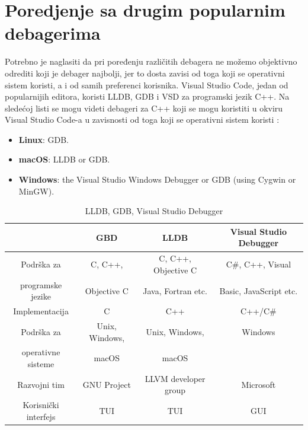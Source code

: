 \documentclass[a4paper]{article}
\begin{document}
\section{Poredjenje sa drugim popularnim debagerima}
\label{sec:naslovN}

Potrebno je naglasiti da pri poređenju različitih debagera ne možemo objektivno odrediti koji je debager najbolji, jer to dosta zavisi od toga koji se operativni sistem koristi, a i od samih preferenci korisnika. Visual Studio Code, jedan od popularnijih editora, koristi LLDB, GDB i VSD za programski jezik C++. Na sledećoj listi se mogu videti debageri za C++ koji se mogu koristiti u okviru Visual Studio Code-a u zavisnosti od toga koji se operativni sistem koristi \cite{vsc_support}:
\begin{itemize}
	\item \textbf{Linux}: GDB.
	\item \textbf{macOS}: LLDB or GDB.
	\item \textbf{Windows}: the Visual Studio Windows Debugger or GDB (using Cygwin or MinGW).
\end{itemize}

\begin{table}[ht!]
	\begin{center}
		\caption{LLDB, GDB, Visual Studio Debugger \cite{gdb}\cite{lldb}\cite{vsd}}
		\label{table:tabela_poredjenje}
		\begin{footnotesize}
			\begin{tabular}{| c | c | c | c |}
				\hline
				& \cellcolor{red!60}GBD & \cellcolor{red!60}LLDB & \cellcolor{red!60}Visual Studio Debugger \\ 
				\hline
				\cellcolor{orange!60}Podrška za& \cellcolor{yellow!60}C, C++, & \cellcolor{yellow!60}C, C++, Objective C & \cellcolor{yellow!60}C\#, C++, Visual \\ 
				\cellcolor{orange!60}programske jezike & \cellcolor{yellow!60}Objective C & \cellcolor{yellow!60}Java, Fortran etc. & \cellcolor{yellow!60}Basic, JavaScript etc. \\ 
				\hline 
				\cellcolor{orange!60}Implementacija & \cellcolor{yellow!60}C & \cellcolor{yellow!60}C++ & \cellcolor{yellow!60}C++/C\# \\
				\hline
				\cellcolor{orange!60}Podrška za& \cellcolor{yellow!60}Unix, Windows,& \cellcolor{yellow!60}Unix, Windows,& \cellcolor{yellow!60}Windows\\
				\cellcolor{orange!60}operativne sisteme & \cellcolor{yellow!60}macOS & \cellcolor{yellow!60}macOS & \cellcolor{yellow!60}\\
				\hline
				\cellcolor{orange!60}Razvojni tim & \cellcolor{yellow!60}GNU Project & \cellcolor{yellow!60}LLVM developer group & \cellcolor{yellow!60}Microsoft \\
				\hline
				\cellcolor{orange!60}Korisnički interfejs & \cellcolor{yellow!60}TUI & \cellcolor{yellow!60}TUI & \cellcolor{yellow!60}GUI\\
				\hline
			\end{tabular}
		\end{footnotesize}
	\end{center}
\end{table}
\end{document}
